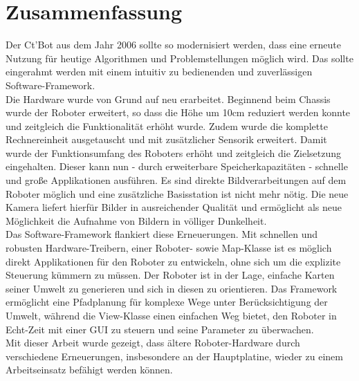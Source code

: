 \documentclass[twoside,11pt, a4paper]{report}
\begin{document}
	\section{Zusammenfassung}
	Der Ct'Bot aus dem Jahr 2006 sollte so modernisiert werden, dass eine erneute Nutzung für heutige Algorithmen und Problemstellungen möglich wird. Das sollte eingerahmt werden mit einem intuitiv zu bedienenden und zuverlässigen Software-Framework. \\
	Die Hardware wurde von Grund auf neu erarbeitet. Beginnend beim Chassis wurde der Roboter erweitert, so dass die Höhe um 10cm reduziert werden konnte und zeitgleich die Funktionalität erhöht wurde. Zudem wurde die komplette Rechnereinheit ausgetauscht und mit zusätzlicher Sensorik erweitert. Damit wurde der Funktionsumfang des Roboters erhöht und zeitgleich die Zielsetzung eingehalten. Dieser kann nun - durch erweiterbare Speicherkapazitäten - schnelle und große Applikationen ausführen. Es sind direkte Bildverarbeitungen auf dem Roboter möglich und eine zusätzliche Basisstation ist nicht mehr nötig. Die neue Kamera liefert hierfür Bilder in ausreichender Qualität und ermöglicht als neue Möglichkeit die Aufnahme von Bildern in völliger Dunkelheit. \\
	Das Software-Framework flankiert diese Erneuerungen. Mit schnellen und robusten Hardware-Treibern, einer Roboter- sowie Map-Klasse ist es möglich direkt Applikationen für den Roboter zu entwickeln, ohne sich um die explizite Steuerung kümmern zu müssen. Der Roboter ist in der Lage, einfache Karten seiner Umwelt zu generieren und sich in diesen zu orientieren. Das Framework ermöglicht eine Pfadplanung für komplexe Wege unter Berücksichtigung der Umwelt, während die View-Klasse einen einfachen Weg bietet, den Roboter in Echt-Zeit mit einer GUI zu steuern und seine Parameter zu überwachen. \\
	Mit dieser Arbeit wurde gezeigt, dass ältere Roboter-Hardware durch verschiedene Erneuerungen, insbesondere an der Hauptplatine, wieder zu einem Arbeitseinsatz befähigt werden können. 
	
\end{document}
